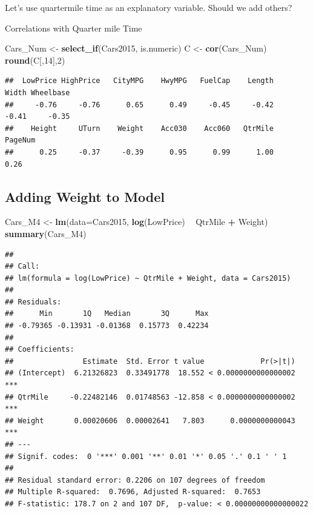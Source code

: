 \documentclass[]{book}
\newenvironment{Shaded}{\begin{snugshade}}{\end{snugshade}}
\newcommand{\KeywordTok}[1]{\textcolor[rgb]{0.13,0.29,0.53}{\textbf{#1}}}
\newcommand{\DataTypeTok}[1]{\textcolor[rgb]{0.13,0.29,0.53}{#1}}
\newcommand{\DecValTok}[1]{\textcolor[rgb]{0.00,0.00,0.81}{#1}}
\newcommand{\StringTok}[1]{\textcolor[rgb]{0.31,0.60,0.02}{#1}}
\newcommand{\OperatorTok}[1]{\textcolor[rgb]{0.81,0.36,0.00}{\textbf{#1}}}
\newcommand{\NormalTok}[1]{#1}
\begin{document}
Let's use quartermile time as an explanatory variable. Should we add
others?

Correlations with Quarter mile Time

\begin{Shaded}
\begin{Highlighting}[]
\NormalTok{Cars_Num <-}\StringTok{ }\KeywordTok{select_if}\NormalTok{(Cars2015, is.numeric)}
\NormalTok{C <-}\StringTok{ }\KeywordTok{cor}\NormalTok{(Cars_Num)}
\KeywordTok{round}\NormalTok{(C[,}\DecValTok{14}\NormalTok{],}\DecValTok{2}\NormalTok{)}
\end{Highlighting}
\end{Shaded}

\begin{verbatim}
##  LowPrice HighPrice   CityMPG    HwyMPG   FuelCap    Length     Width Wheelbase 
##     -0.76     -0.76      0.65      0.49     -0.45     -0.42     -0.41     -0.35 
##    Height     UTurn    Weight    Acc030    Acc060   QtrMile   PageNum 
##      0.25     -0.37     -0.39      0.95      0.99      1.00      0.26
\end{verbatim}

\subsection{Adding Weight to Model}\label{adding-weight-to-model}

\begin{Shaded}
\begin{Highlighting}[]
\NormalTok{Cars_M4 <-}\StringTok{ }\KeywordTok{lm}\NormalTok{(}\DataTypeTok{data=}\NormalTok{Cars2015, }\KeywordTok{log}\NormalTok{(LowPrice) }\OperatorTok{~}\StringTok{ }\NormalTok{QtrMile }\OperatorTok{+}\StringTok{ }\NormalTok{Weight)}
\KeywordTok{summary}\NormalTok{(Cars_M4)}
\end{Highlighting}
\end{Shaded}

\begin{verbatim}
## 
## Call:
## lm(formula = log(LowPrice) ~ QtrMile + Weight, data = Cars2015)
## 
## Residuals:
##      Min       1Q   Median       3Q      Max 
## -0.79365 -0.13931 -0.01368  0.15773  0.42234 
## 
## Coefficients:
##                Estimate  Std. Error t value             Pr(>|t|)    
## (Intercept)  6.21326823  0.33491778  18.552 < 0.0000000000000002 ***
## QtrMile     -0.22482146  0.01748563 -12.858 < 0.0000000000000002 ***
## Weight       0.00020606  0.00002641   7.803      0.0000000000043 ***
## ---
## Signif. codes:  0 '***' 0.001 '**' 0.01 '*' 0.05 '.' 0.1 ' ' 1
## 
## Residual standard error: 0.2206 on 107 degrees of freedom
## Multiple R-squared:  0.7696, Adjusted R-squared:  0.7653 
## F-statistic: 178.7 on 2 and 107 DF,  p-value: < 0.00000000000000022
\end{verbatim}
\end{document}
